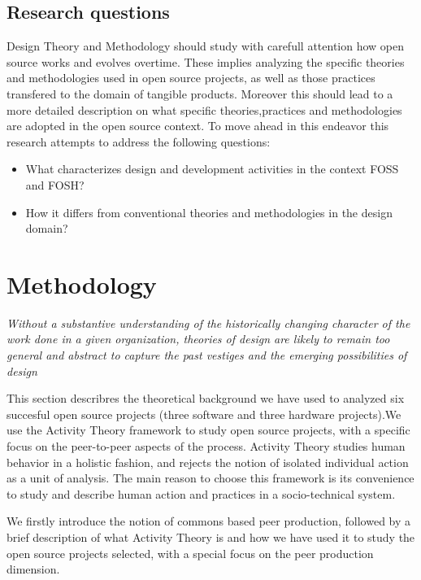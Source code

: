 \documentclass{ICED-Paper}%
\begin{document}
\subsection{Research questions}

\bigskip

Design Theory and Methodology should study with carefull attention how open source works and evolves overtime. These implies analyzing the specific theories and methodologies used in open source projects, as well as those practices transfered to the domain of tangible products. Moreover this should lead to a more detailed description on what specific theories,practices and methodologies are adopted in the open source context. To move ahead in this endeavor this research attempts to address the following questions:
\bigskip

\begin{itemize}
  \item What characterizes design and development activities in the context FOSS and FOSH?
  \item How it differs from conventional theories and methodologies in the design domain?
\end{itemize}


\section{Methodology}
\emph{Without a substantive understanding of the historically changing character of the work done in a given organization, theories of design are likely to remain too general and abstract to capture the past vestiges and the emerging possibilities of design}\cite{ExpansiveDesign}
\bigskip

This section describres the theoretical background we have used to analyzed six succesful open source projects (three software and three hardware projects).We use the Activity Theory framework to study open source projects, with a specific focus on the peer-to-peer aspects of the process. Activity Theory studies human behavior in a holistic fashion, and rejects the notion of isolated individual action as a unit of analysis. The main reason to choose this framework is its convenience to study and describe human action and practices in a socio-technical system.

We firstly introduce the notion of commons based peer production, followed by a brief description of what  Activity Theory is and how we have used it to study the open source projects selected, with a special focus on the peer production dimension.
\end{document}
